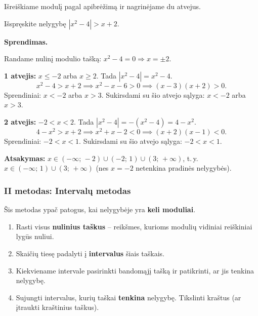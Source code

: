 Išreiškiame modulį pagal apibrėžimą ir nagrinėjame du atvejus.

\begin{example}
Išspręskite nelygybę $|x^2 - 4| > x + 2$.

\textbf{Sprendimas.}

Randame nulinį modulio tašką: $x^2 - 4 = 0 \Rightarrow x = \pm 2$.

\textbf{1 atvejis:} $x \leq -2$ arba $x \geq 2$. Tada $|x^2 - 4| = x^2 - 4$.
\[
x^2 - 4 > x + 2 \implies x^2 - x - 6 > 0 \implies (x-3)(x+2) > 0.
\]
Sprendiniai: $x < -2$ arba $x > 3$.
Sukirsdami su šio atvejo sąlyga: $x < -2$ arba $x > 3$.

\textbf{2 atvejis:} $-2 < x < 2$. Tada $|x^2 - 4| = -(x^2 - 4) = 4 - x^2$.
\[
4 - x^2 > x + 2 \implies x^2 + x - 2 < 0 \implies (x+2)(x-1) < 0.
\]
Sprendiniai: $-2 < x < 1$.
Sukirsdami su šio atvejo sąlyga: $-2 < x < 1$.

\textbf{Atsakymas:} $x \in (-\infty;\, -2) \cup (-2;\, 1) \cup (3;\, +\infty)$,
t.\,y. $x \in (-\infty;\, 1) \cup (3;\, +\infty)$ (nes $x = -2$ netenkina pradinės nelygybės).
\end{example}

\subsubsection*{II metodas: Intervalų metodas}

Šis metodas ypač patogus, kai nelygybėje yra \textbf{keli moduliai}.

\begin{tcolorbox}[title=Intervalų metodo žingsniai, colback=green!5, colframe=green!60]
\begin{enumerate}
  \item Rasti visus \textbf{nulinius taškus} – reikšmes, kurioms modulių vidiniai reiškiniai lygūs nuliui.
  \item Skaičių tiesę padalyti į \textbf{intervalus} šiais taškais.
  \item Kiekviename intervale pasirinkti bandomąjį tašką ir patikrinti, ar jis tenkina nelygybę.
  \item Sujungti intervalus, kurių taškai \textbf{tenkina} nelygybę. Tikslinti kraštus (ar įtraukti kraštinius taškus).
\end{enumerate}
\end{tcolorbox}

